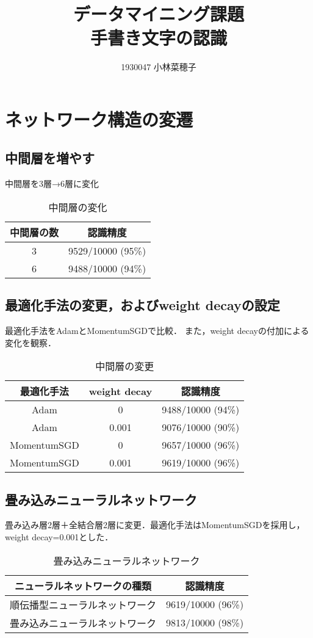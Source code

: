 \documentclass[a4paper, 12pt, dvipdfmx]{jarticle}
\title{データマイニング課題\\ 手書き文字の認識}
\author{1930047 小林菜穂子}
\date{}
\begin{document}
\maketitle

\section{ネットワーク構造の変遷}
\subsection{中間層を増やす}
中間層を3層→6層に変化
\begin{table}[htb]
  \centering
  \caption{中間層の変化}
  \begin{tabular}{c|c} \hline
    中間層の数 & 認識精度 \\ \hline
    3 & 9529/10000 (95\%) \\
    6 & 9488/10000 (94\%) \\ \hline
  \end{tabular}
\end{table}

\subsection{最適化手法の変更，およびweight decayの設定}
最適化手法をAdamとMomentumSGDで比較．
また，weight decayの付加による変化を観察．
\begin{table}[htb]
  \centering
  \caption{中間層の変更}
  \begin{tabular}{c c |c} \hline
    最適化手法 & weight decay & 認識精度 \\ \hline
    Adam & 0 & 9488/10000 (94\%)  \\
    Adam & 0.001 & 9076/10000 (90\%) \\
    MomentumSGD & 0 & 9657/10000 (96\%)\\
    MomentumSGD & 0.001 & 9619/10000 (96\%) \\ \hline
  \end{tabular}
\end{table}

\subsection{畳み込みニューラルネットワーク}
畳み込み層2層＋全結合層2層に変更．最適化手法はMomentumSGDを採用し，weight decay=0.001とした．

\begin{table}[htb]
  \centering
  \caption{畳み込みニューラルネットワーク}
  \begin{tabular}{c|c} \hline
    ニューラルネットワークの種類　& 認識精度 \\ \hline
    順伝播型ニューラルネットワーク & 9619/10000 (96\%) \\
    畳み込みニューラルネットワーク & 9813/10000 (98\%) \\ \hline
  \end{tabular}
\end{table}
\end{document}
